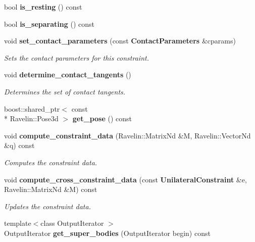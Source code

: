\begin{DoxyCompactItemize}
\item 
bool {\bfseries is\-\_\-resting} () const \label{classMoby_1_1UnilateralConstraint_a5ebb790d466282110f1b3da0dffbfa07}

\item 
bool {\bfseries is\-\_\-separating} () const \label{classMoby_1_1UnilateralConstraint_ab2740d28baefc1589bc02cdf2dad4c08}

\item 
void {\bf set\-\_\-contact\-\_\-parameters} (const {\bf Contact\-Parameters} \&cparams)\label{classMoby_1_1UnilateralConstraint_a8a91f87bc2bbf25c1619fa3f4df05249}

\begin{DoxyCompactList}\small\item\em Sets the contact parameters for this constraint. \end{DoxyCompactList}\item 
void {\bf determine\-\_\-contact\-\_\-tangents} ()\label{classMoby_1_1UnilateralConstraint_ac707005add03e4775ccea7ea56032275}

\begin{DoxyCompactList}\small\item\em Determines the set of contact tangents. \end{DoxyCompactList}\item 
boost\-::shared\-\_\-ptr$<$ const \\*
Ravelin\-::\-Pose3d $>$ {\bfseries get\-\_\-pose} () const \label{classMoby_1_1UnilateralConstraint_a47e03e17d6eeb8a9f84a3cd3ac98a63d}

\item 
void {\bf compute\-\_\-constraint\-\_\-data} (Ravelin\-::\-Matrix\-Nd \&M, Ravelin\-::\-Vector\-Nd \&q) const \label{classMoby_1_1UnilateralConstraint_ae6b2d71c5540d42d0374a069e4368d27}

\begin{DoxyCompactList}\small\item\em Computes the constraint data. \end{DoxyCompactList}\item 
void {\bf compute\-\_\-cross\-\_\-constraint\-\_\-data} (const {\bf Unilateral\-Constraint} \&e, Ravelin\-::\-Matrix\-Nd \&M) const \label{classMoby_1_1UnilateralConstraint_ac1fc810fa255d299a027abad0e646579}

\begin{DoxyCompactList}\small\item\em Updates the constraint data. \end{DoxyCompactList}\item 
{\footnotesize template$<$class Output\-Iterator $>$ }\\Output\-Iterator {\bfseries get\-\_\-super\-\_\-bodies} (Output\-Iterator begin) const \label{classMoby_1_1UnilateralConstraint_ae4eedf2f7fbae611c060e191273f916c}


\end{DoxyCompactItemize}
